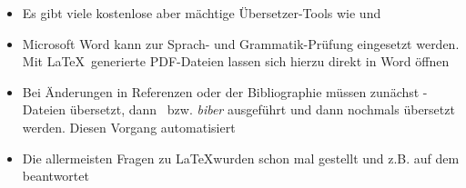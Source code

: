 \smallskip
\begin{itemize}[label={\faLightbulbO}]
    \item Es gibt viele kostenlose aber mächtige Übersetzer-Tools wie  und 
    \item Microsoft Word kann zur Sprach- und Grammatik-Prüfung eingesetzt werden. Mit \LaTeX\ generierte PDF-Dateien lassen sich hierzu direkt in Word öffnen
    \item Bei Änderungen in Referenzen oder der Bibliographie müssen zunächst -Dateien übersetzt, dann \bibtex\ bzw. \emph{biber} ausgeführt und dann nochmals übersetzt werden. Diesen Vorgang automatisiert 
    \item Die allermeisten Fragen zu \LaTeX wurden schon mal gestellt und z.B. auf dem  beantwortet
\end{itemize}

